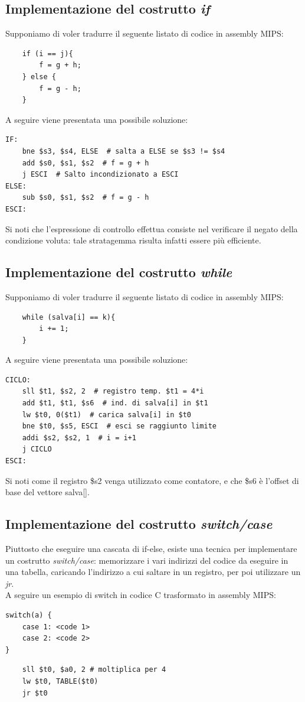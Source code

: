 \documentclass[class=book, crop=false]{standalone}
\begin{document}
\subsection{Implementazione del costrutto \emph{if}}
Supponiamo di voler tradurre il seguente listato di codice in assembly MIPS:
\begin{verbatim}
	if (i == j){
		f = g + h;
	} else {
		f = g - h;
	}
\end{verbatim}

A seguire viene presentata una possibile soluzione:
\begin{verbatim}
IF:
	bne $s3, $s4, ELSE  # salta a ELSE se $s3 != $s4
	add $s0, $s1, $s2  # f = g + h
	j ESCI  # Salto incondizionato a ESCI
ELSE:
	sub $s0, $s1, $s2  # f = g - h
ESCI:
\end{verbatim}
Si noti che l'espressione di controllo effettua consiste nel verificare il negato della condizione voluta: tale stratagemma risulta infatti essere più efficiente.

\subsection{Implementazione del costrutto \emph{while}}
Supponiamo di voler tradurre il seguente listato di codice in assembly MIPS:
\begin{verbatim}
	while (salva[i] == k){
		i += 1;
	}
\end{verbatim}

A seguire viene presentata una possibile soluzione:
\begin{verbatim}
CICLO:
	sll $t1, $s2, 2  # registro temp. $t1 = 4*i
	add $t1, $t1, $s6  # ind. di salva[i] in $t1
	lw $t0, 0($t1)  # carica salva[i] in $t0
	bne $t0, $s5, ESCI  # esci se raggiunto limite
	addi $s2, $s2, 1  # i = i+1
	j CICLO
ESCI:
\end{verbatim}
Si noti come il registro \$s2 venga utilizzato come contatore, e che \$s6 è l'offset di base del vettore salva[].

\subsection{Implementazione del costrutto \emph{switch/case}}
Piuttosto che eseguire una cascata di if-else, esiste una tecnica per implementare un costrutto \emph{switch/case}: memorizzare i vari indirizzi del codice da eseguire in una tabella, caricando l'indirizzo a cui saltare in un registro, per poi utilizzare un \emph{jr}.\\
A seguire un esempio di switch in codice C trasformato in assembly MIPS:
\begin{verbatim}
switch(a) {
	case 1: <code 1>
	case 2: <code 2>
}
\end{verbatim}
\begin{verbatim}
	sll $t0, $a0, 2 # moltiplica per 4
	lw $t0, TABLE($t0)
	jr $t0
\end{verbatim}
\end{document}
